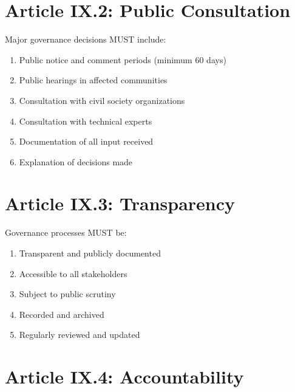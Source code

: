 \vspace{0.5cm}

\section{Article IX.2: Public Consultation}

\begin{articlebox}
Major governance decisions MUST include:
\begin{enumerate}
    \item Public notice and comment periods (minimum 60 days)
    \item Public hearings in affected communities
    \item Consultation with civil society organizations
    \item Consultation with technical experts
    \item Documentation of all input received
    \item Explanation of decisions made
\end{enumerate}
\end{articlebox}

\vspace{0.5cm}

\section{Article IX.3: Transparency}

\begin{articlebox}
Governance processes MUST be:
\begin{enumerate}
    \item Transparent and publicly documented
    \item Accessible to all stakeholders
    \item Subject to public scrutiny
    \item Recorded and archived
    \item Regularly reviewed and updated
\end{enumerate}
\end{articlebox}

\vspace{0.5cm}

\section{Article IX.4: Accountability}

